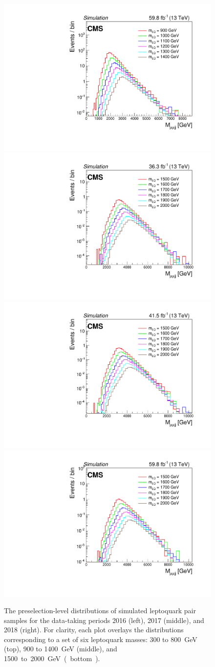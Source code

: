 \begin{figure}[H]
    {\includegraphics[width=.32\textwidth]{Images/Analysis/SignalMassStudy/2018/Mujbj_M900_to_M1400.pdf}}
    {\includegraphics[width=.32\textwidth]{Images/Analysis/SignalMassStudy/2016/Mujbj_M1500_to_M2000.pdf}}
    {\includegraphics[width=.32\textwidth]{Images/Analysis/SignalMassStudy/2017/Mujbj_M1500_to_M2000.pdf}}
    {\includegraphics[width=.32\textwidth]{Images/Analysis/SignalMassStudy/2018/Mujbj_M1500_to_M2000.pdf}}
    \caption{The preselection-level \Muujj distributions of simulated leptoquark pair samples for the data-taking periods 2016 (left), 2017 (middle), and 2018 (right). For clarity, each plot overlays the distributions corresponding to a set of six leptoquark masses: \SI{300}{} to \SI{800}{GeV} (top), \SI{900}{} to \SI{1400}{GeV} (middle), and \SI{1500} to \SI{2000}{GeV} (bottom).}
    \label{figapp:lqsim1}
\end{figure}

